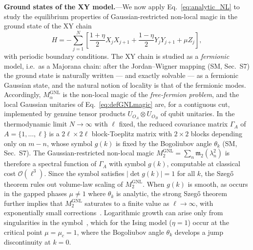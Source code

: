\documentclass[aps,prl,twocolumn,superscriptaddress,reprint,longbibliography,nofootinbib]{revtex4-2}
\newcommand{\RENYI}{\alpha}
\begin{document}
\textbf{Ground states of the XY model.}---We now apply Eq.~\eqref{eq:analytic_NL} to study the equilibrium properties of Gaussian-restricted non-local magic in the ground state of the XY chain
\begin{equation}
    H = -\sum_{j=1}^{N}\!\left[\frac{1+\eta}{2}X_j X_{j+1} + \frac{1-\eta}{2}Y_j Y_{j+1} + \mu Z_j\right],
    \label{eq:xy}
\end{equation}
with periodic boundary conditions.
The XY chain is studied as a \emph{fermionic} model, i.e.\ as a Majorana chain: after the Jordan--Wigner mapping (SM, Sec.~S7) the ground state is naturally written --- and exactly solvable --- as a fermionic Gaussian state, and the natural notion of locality is that of the fermionic modes.
Accordingly, $M_\RENYI^{\mathrm{GNL}}$ is the non-local magic of the \textit{free-fermion problem}, and the local Gaussian unitaries of Eq.~\eqref{eq:defGNLmagic} are, for a contiguous cut, implemented by genuine tensor products $U_{O_A}\otimes U_{O_B}$ of qubit unitaries.
In the thermodynamic limit $N\to\infty$ with $\ell$ fixed, the reduced covariance matrix $\Gamma_A$ of $A=\{1,\dots,\ell\}$ is a $2\ell\times 2\ell$ block-Toeplitz matrix with $2\times 2$ blocks depending only on $m-n$, whose symbol $g(k)$ is fixed by the Bogoliubov angle $\theta_k$ (SM, Sec.~S7).
The Gaussian-restricted non-local magic $M_2^{\mathrm{GNL}} = \sum_n \mathfrak{m}_2(\lambda_n^2)$ is therefore a spectral function of $\Gamma_A$ with symbol $g(k)$, computable at classical cost $\mathcal{O}(\ell^3)$.
Since the symbol satisfies $|\det g(k)| = 1$ for all $k$, the Szeg\H{o} theorem rules out volume-law scaling of $M_2^{\mathrm{GNL}}$.
When $g(k)$ is smooth, as occurs in the gapped phases $\mu \neq 1$ where $\theta_k$ is analytic, the strong Szeg\H{o} theorem further implies that $M_2^{\mathrm{GNL}}$ saturates to a finite value as $\ell \to \infty$, with exponentially small corrections~\cite{simon2010szego}.
Logarithmic growth can arise only from singularities in the symbol~\cite{Jin_2004}, which for the Ising model ($\eta=1$) occur at the critical point $\mu = \mu_c = 1$, where the Bogoliubov angle $\theta_k$ develops a jump discontinuity at $k = 0$.
\end{document}
